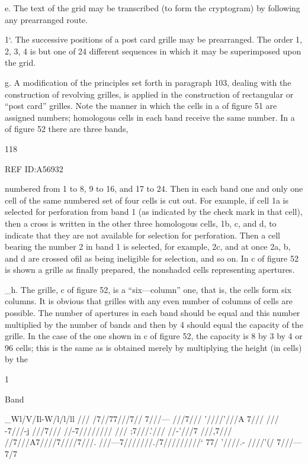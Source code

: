e. The text of the grid may be transcribed (to form the cryptogram)
by following any prearranged route.

1‘. The successive positions of a post card grille may be prearranged.
The order 1, 2, 3, 4 is but one of 24 different sequences in which it may
be superimposed upon the grid.

g. A modiﬁcation of the principles set forth in paragraph 103, dealing
with the construction of revolving grilles, is applied in the construction
of rectangular or “post card” grilles. Note the manner in which the
cells in a of ﬁgure 51 are assigned numbers; homologous cells in each
band receive the same number. In a of ﬁgure 52 there are three bands,

118

 

REF ID:A56932

numbered from 1 to 8, 9 to 16, and 17 to 24. Then in each band one
and only one cell of the same numbered set of four cells is cut out. For
example, if cell 1a is selected for perforation from band 1 (as indicated
by the check mark in that cell), then a cross is written in the other three
homologous cells, 1b, c, and d, to indicate that they are not available for
selection for perforation. Then a cell bearing the number 2 in band 1
is selected, for example, 2c, and at once 2a, b, and d are crossed oﬁl as
being ineligible for selection, and so on. In c of ﬁgure 52 is shown a
grille as ﬁnally prepared, the nonshadcd cells representing apertures.

_h. The grille, c of ﬁgure 52, is a “six—column” one, that is, the cells
form six columns. It is obvious that grilles with any even number of
columns of cells are possible. The number of apertures in each band
should be equal and this number multiplied by the number of bands and
then by 4 should equal the capacity of the grille. In the case of the one
shown in c of ﬁgure 52, the capacity is 8 by 3 by 4 or 96 cells; this is
the same as is obtained merely by multiplying the height (in cells) by the

1

 
   
     
  
   
     

  

Band

 
 

_Wl/V/Il-W/l/l/ll
/// /7//77///7// 7///—
///7/// ’////’///A 7///
/// -7///-j
///7/// //-7////////
/// ;7///.'/// //-'///7
///,7/// //7///A7////7////7///.
///—7///////./7/////////‘
77/ '////.- ////'(/
7///—7/7


